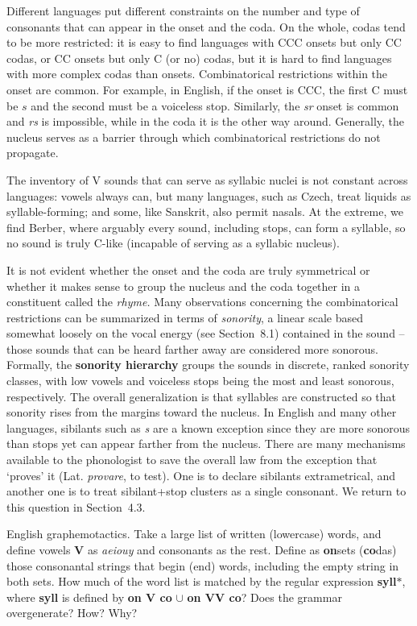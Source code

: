 Different languages put different constraints on the number and type of
consonants that can appear in the onset and the coda. On the whole, codas tend
to be more restricted: it is easy to find languages with CCC onsets but only
CC codas, or CC onsets but only C (or no) codas, but it is hard to find
languages with more complex codas than onsets.  Combinatorical restrictions
within the onset are common. For example, in English, if the onset is CCC, the
first C must be $s$ and the second must be a voiceless stop. Similarly, the
{\it sr} onset is common and {\it *rs} is impossible, while in the coda it is
the other way around. Generally, the nucleus serves as a barrier through which
combinatorical restrictions do not propagate.

The inventory of V sounds that can serve as syllabic nuclei is not constant
across languages: vowels always can, but many languages, such as Czech, treat
liquids as syllable-forming; and some, like Sanskrit, also permit nasals. At
the extreme, we find Berber, where arguably every sound, including stops, can
form a syllable, so no sound is truly C-like (incapable of serving as a
syllabic nucleus).

It is not evident whether the onset and the coda are truly symmetrical or
whether it makes sense to group the nucleus and the coda together in a
constituent called the {\it rhyme.} Many observations concerning
the combinatorical restrictions can be summarized in terms of {\it sonority},
a linear scale based somewhat loosely on the vocal energy (see Section~8.1) contained
in the sound -- those sounds that can be heard farther away are considered
more sonorous. Formally, the {\bf sonority hierarchy} groups the sounds in
discrete, ranked sonority classes, with low vowels and voiceless stops being
the most and least sonorous, respectively. The overall generalization is that
syllables are constructed so that sonority rises from the margins toward the
nucleus. In English and many other languages, sibilants such as {\it s} are a
known exception since they are more sonorous than stops yet can appear
farther from the nucleus. There are many mechanisms available to the
phonologist to save the overall law from the exception that `proves' it (Lat.
{\it provare}, to test). One is to declare sibilants extrametrical, and
another one is to treat sibilant+stop clusters as a single consonant.  We
return to this question in Section~4.3.  

\smallskip{} English graphemotactics. Take
a large list of written (lowercase) words, and define vowels {\bf V} as {\it
aeiouy} and consonants as the rest.  Define as {\bf on}sets ({\bf co}das) those
consonantal strings that begin (end) words, including the empty string in both
sets.  How much of the word list is matched by the regular expression {\bf
syll}$*$, where {\bf syll} is defined by {\bf on V co} $\cup$ {\bf on VV co}?
Does the grammar overgenerate? How? Why? 

